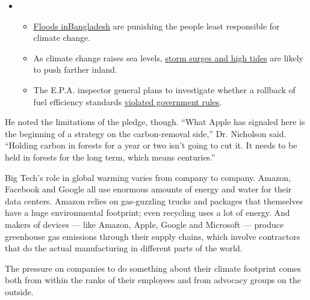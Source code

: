 \begin{itemize}
\item
  \begin{itemize}
  \tightlist
  \item
    \href{https://www.nytimes3xbfgragh.onion/2020/07/30/climate/bangladesh-floods.html?action=click\&pgtype=Article\&state=default\&region=MAIN_CONTENT_1\&context=storylines_keepup}{Floods
    in}\href{https://www.nytimes3xbfgragh.onion/2020/07/30/climate/bangladesh-floods.html?action=click\&pgtype=Article\&state=default\&region=MAIN_CONTENT_1\&context=storylines_keepup}{Bangladesh}
    are punishing the people least responsible for climate change.
  \item
    As climate change raises sea levels,
    \href{https://www.nytimes3xbfgragh.onion/2020/07/30/climate/sea-level-inland-floods.html?action=click\&pgtype=Article\&state=default\&region=MAIN_CONTENT_1\&context=storylines_keepup}{storm
    surges and high tides} are likely to push farther inland.
  \item
    The E.P.A. inspector general plans to investigate whether a rollback
    of fuel efficiency standards
    \href{https://www.nytimes3xbfgragh.onion/2020/07/27/climate/trump-fuel-efficiency-rule.html?action=click\&pgtype=Article\&state=default\&region=MAIN_CONTENT_1\&context=storylines_keepup}{violated
    government rules}.
  \end{itemize}
\end{itemize}

He noted the limitations of the pledge, though. ``What Apple has
signaled here is the beginning of a strategy on the carbon-removal
side,'' Dr. Nicholson said. ``Holding carbon in forests for a year or
two isn't going to cut it. It needs to be held in forests for the long
term, which means centuries.''

Big Tech's role in global warming varies from company to company.
Amazon, Facebook and Google all use enormous amounts of energy and water
for their data centers. Amazon relies on gas-guzzling trucks and
packages that themselves have a huge environmental footprint; even
recycling uses a lot of energy. And makers of devices --- like Amazon,
Apple, Google and Microsoft --- produce greenhouse gas emissions through
their supply chains, which involve contractors that do the actual
manufacturing in different parts of the world.

The pressure on companies to do something about their climate footprint
comes both from within the ranks of their employees and from advocacy
groups on the outside.

